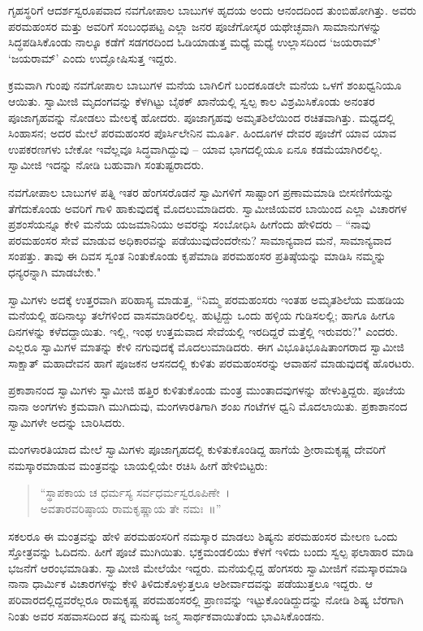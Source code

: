 ಗೃಹಸ್ಥರಿಗೆ ಆದರ್ಶಸ್ವರೂಪವಾದ ನವಗೋಪಾಲ ಬಾಬುಗಳ ಹೃದಯ ಅಂದು ಆನಂದದಿಂದ ತುಂಬಿಹೋಗಿತ್ತು. ಅವರು ಪರಮಹಂಸರ ಮತ್ತು ಅವರಿಗೆ ಸಂಬಂಧಪಟ್ಟ ಎಲ್ಲಾ ಜನರ ಪೂಜೆಗೋಸ್ಕರ ಯಥೇಚ್ಛವಾಗಿ ಸಾಮಾನುಗಳನ್ನು ಸಿದ್ಧಪಡಿಸಿಕೊಂಡು ನಾಲ್ಕೂ ಕಡೆಗೆ ಸಡಗರದಿಂದ ಓಡಿಯಾಡುತ್ತ ಮಧ್ಯೆ ಮಧ್ಯೆ ಉಲ್ಲಾಸದಿಂದ ‘ಜಯರಾಮ್’ ‘ಜಯರಾಮ್’ ಎಂದು ಉದ್ಘೋಷಿಸುತ್ತ ಇದ್ದರು.

ಕ್ರಮವಾಗಿ ಗುಂಪು ನವಗೋಪಾಲ ಬಾಬುಗಳ ಮನೆಯ ಬಾಗಿಲಿಗೆ ಬಂದಕೂಡಲೇ ಮನೆಯ ಒಳಗೆ ಶಂಖಧ್ವನಿಯೂ ಆಯಿತು. ಸ್ವಾಮೀಜಿ ಮೃದಂಗವನ್ನು ಕೆಳಗಿಟ್ಟು ಬೈಠಕ್ ಖಾನೆಯಲ್ಲಿ ಸ್ವಲ್ಪ ಕಾಲ ವಿಶ್ರಮಿಸಿಕೊಂಡು ಅನಂತರ ಪೂಜಾಗೃಹವನ್ನು ನೋಡಲು ಮೇಲಕ್ಕೆ ಹೋದರು. ಪೂಜಾಗೃಹವು ಅಮೃತಶಿಲೆಯಿಂದ ರಚಿತವಾಗಿತ್ತು. ಮಧ್ಯದಲ್ಲಿ ಸಿಂಹಾಸನ; ಅದರ ಮೇಲೆ ಪರಮಹಂಸರ ಪೊರ್ಸಿಲೇನಿನ ಮೂರ್ತಿ. ಹಿಂದೂಗಳ ದೇವರ ಪೂಜೆಗೆ ಯಾವ ಯಾವ ಉಪಕರಣಗಳು ಬೇಕೋ ಇವೆಲ್ಲವೂ ಸಿದ್ಧವಾಗಿದ್ದುವು – ಯಾವ ಭಾಗದಲ್ಲಿಯೂ ಏನೂ ಕಡಮೆಯಾಗಿರಲಿಲ್ಲ. ಸ್ವಾಮೀಜಿ ಇದನ್ನು ನೋಡಿ ಬಹುವಾಗಿ ಸಂತುಷ್ಟರಾದರು.

ನವಗೋಪಾಲ ಬಾಬುಗಳ ಪತ್ನಿ ಇತರ ಹೆಂಗಸರೊಡನೆ ಸ್ವಾಮಿಗಳಿಗೆ ಸಾಷ್ಟಾಂಗ ಪ್ರಣಾಮಮಾಡಿ ಬೀಸಣಿಗೆಯನ್ನು ತೆಗೆದುಕೊಂಡು ಅವರಿಗೆ ಗಾಳಿ ಹಾಕುವುದಕ್ಕೆ ಮೊದಲುಮಾಡಿದರು. ಸ್ವಾಮೀಜಿಯವರ ಬಾಯಿಂದ ಎಲ್ಲಾ ವಿಚಾರಗಳ ಪ್ರಶಂಸೆಯನ್ನೂ ಕೇಳಿ ಮನೆಯ ಯಜಮಾನಿಯು ಅವರನ್ನು ಸಂಬೋಧಿಸಿ ಹೀಗೆಂದು ಹೇಳಿದರು – “ನಾವು ಪರಮಹಂಸರ ಸೇವೆ ಮಾಡುವ ಅಧಿಕಾರವನ್ನು ಪಡೆಯುವುದೆಂದರೇನು? ಸಾಮಾನ್ಯವಾದ ಮನೆ, ಸಾಮಾನ್ಯವಾದ ಸಂಪತ್ತು. ತಾವು ಈ ದಿವಸ ಸ್ವಂತ ನಿಂತುಕೊಂಡು ಕೃಪೆಮಾಡಿ ಪರಮಹಂಸರ ಪ್ರತಿಷ್ಠೆಯನ್ನು ಮಾಡಿಸಿ ನಮ್ಮನ್ನು ಧನ್ಯರನ್ನಾಗಿ ಮಾಡಬೇಕು."

ಸ್ವಾಮಿಗಳು ಅದಕ್ಕೆ ಉತ್ತರವಾಗಿ ಪರಿಹಾಸ್ಯ ಮಾಡುತ್ತ, “ನಿಮ್ಮ ಪರಮಹಂಸರು ಇಂತಹ ಅಮೃತಶಿಲೆಯ ಮಹಡಿಯ ಮನೆಯಲ್ಲಿ ಹದಿನಾಲ್ಕು ತಲೆಗಳಿಂದ ವಾಸಮಾಡಿರಲಿಲ್ಲ. ಹುಟ್ಟಿದ್ದು ಒಂದು ಹಳ್ಳಿಯ ಗುಡಿಸಲಲ್ಲಿ; ಹಾಗೂ ಹೀಗೂ ದಿನಗಳನ್ನು ಕಳೆದದ್ದಾಯಿತು. ಇಲ್ಲಿ, ಇಂಥ ಉತ್ತಮವಾದ ಸೇವೆಯಲ್ಲಿ ಇರದಿದ್ದರೆ ಮತ್ತೆಲ್ಲಿ ಇರುವರು?" ಎಂದರು. ಎಲ್ಲರೂ ಸ್ವಾಮಿಗಳ ಮಾತನ್ನು ಕೇಳಿ ನಗುವುದಕ್ಕೆ ಮೊದಲುಮಾಡಿದರು. ಈಗ ವಿಭೂತಿಭೂಷಿತಾಂಗರಾದ ಸ್ವಾಮೀಜಿ ಸಾಕ್ಷಾತ್ ಮಹಾದೇವನ ಹಾಗೆ ಪೂಜಕನ ಆಸನದಲ್ಲಿ ಕುಳಿತು ಪರಮಹಂಸರನ್ನು ಆವಾಹನೆ ಮಾಡುವುದಕ್ಕೆ ಹೊರಟರು.

ಪ್ರಕಾಶಾನಂದ ಸ್ವಾಮಿಗಳು ಸ್ವಾಮೀಜಿ ಹತ್ತಿರ ಕುಳಿತುಕೊಂಡು ಮಂತ್ರ ಮುಂತಾದವುಗಳನ್ನು ಹೇಳುತ್ತಿದ್ದರು. ಪೂಜೆಯ ನಾನಾ ಅಂಗಗಳು ಕ್ರಮವಾಗಿ ಮುಗಿದುವು, ಮಂಗಳಾರತಿಗಾಗಿ ಶಂಖ ಗಂಟೆಗಳ ಧ್ವನಿ ಮೊದಲಾಯಿತು. ಪ್ರಕಾಶಾನಂದ ಸ್ವಾಮಿಗಳೇ ಅದನ್ನು ಬಾರಿಸಿದರು.

ಮಂಗಳಾರತಿಯಾದ ಮೇಲೆ ಸ್ವಾಮಿಗಳು ಪೂಜಾಗೃಹದಲ್ಲಿ ಕುಳಿತುಕೊಂಡಿದ್ದ ಹಾಗೆಯೆ ಶ‍್ರೀರಾಮಕೃಷ್ಣ ದೇವರಿಗೆ ನಮಸ್ಕಾರಮಾಡುವ ಮಂತ್ರವನ್ನು ಬಾಯಲ್ಲಿಯೇ ರಚಿಸಿ ಹೀಗೆ ಹೇಳಿಬಿಟ್ಟರು:

\begin{verse}
“ಸ್ಥಾಪಕಾಯ ಚ ಧರ್ಮಸ್ಯ ಸರ್ವಧರ್ಮಸ್ವರೂಪಿಣೇ~।\\ಅವತಾರವರಿಷ್ಠಾಯ ರಾಮಕೃಷ್ಣಾಯ ತೇ ನಮಃ~॥”
\end{verse}

ಸಕಲರೂ ಈ ಮಂತ್ರವನ್ನು ಹೇಳಿ ಪರಮಹಂಸರಿಗೆ ನಮಸ್ಕಾರ ಮಾಡಲು ಶಿಷ್ಯನು ಪರಮಹಂಸರ ಮೇಲಣ ಒಂದು ಸ್ತೋತ್ರವನ್ನು ಓದಿದನು. ಹೀಗೆ ಪೂಜೆ ಮುಗಿಯಿತು. ಭಕ್ತಮಂಡಲಿಯು ಕೆಳಗೆ ಇಳಿದು ಬಂದು ಸ್ವಲ್ಪ ಫಲಾಹಾರ ಮಾಡಿ ಭಜನೆಗೆ ಆರಂಭಮಾಡಿತು. ಸ್ವಾಮೀಜಿ ಮೇಲೆಯೇ ಇದ್ದರು. ಮನೆಯಲ್ಲಿದ್ದ ಹೆಂಗಸರು ಸ್ವಾಮೀಜಿಗೆ ನಮಸ್ಕಾರಮಾಡಿ ನಾನಾ ಧಾರ್ಮಿಕ ವಿಚಾರಗಳನ್ನು ಕೇಳಿ ತಿಳಿದುಕೊಳ್ಳುತ್ತಲೂ ಆಶೀರ್ವಾದವನ್ನು ಪಡೆಯುತ್ತಲೂ ಇದ್ದರು. ಆ ಪರಿವಾರದಲ್ಲಿದ್ದವರೆಲ್ಲರೂ ರಾಮಕೃಷ್ಣ ಪರಮಹಂಸರಲ್ಲಿ ಪ್ರಾಣವನ್ನು ಇಟ್ಟುಕೊಂಡಿದ್ದುದನ್ನು ನೋಡಿ ಶಿಷ್ಯ ಬೆರಗಾಗಿ ನಿಂತು ಅವರ ಸಹವಾಸದಿಂದ ತನ್ನ ಮನುಷ್ಯ ಜನ್ಮ ಸಾರ್ಥಕವಾಯಿತೆಂದು ಭಾವಿಸಿಕೊಂಡನು.

